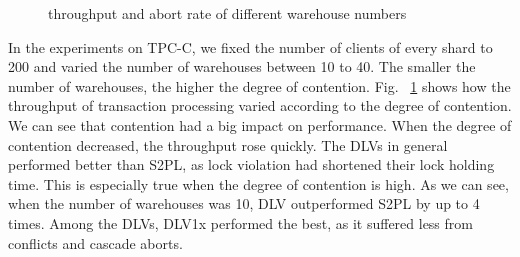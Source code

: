 \documentclass[conference]{IEEEtran}
\begin{document}
\begin{figure}[htbp]
  \centering

\caption{throughput and abort rate of
different warehouse numbers}
\label{fig:plot_tpcc_neworder_add_Warehouse_Warehouse_gather}
\end{figure}

In the experiments on TPC-C, we fixed the number of clients of every shard to 200 and varied the number of warehouses between 10 to 40.
The smaller the number of warehouses, the higher the degree of contention. 
Fig. ~\ref{fig:plot_tpcc_neworder_add_Warehouse_Warehouse_gather} shows how the throughput of transaction processing varied according to the degree of contention.
We can see that contention had a big impact on performance. When the degree of contention decreased, the throughput rose quickly.
The DLVs in general performed better than S2PL, as lock violation had shortened their lock holding time. 
This is especially true when the degree of contention is high. As we can see, when the number of warehouses was 10, DLV outperformed S2PL by up to 4 times.
Among the DLVs, DLV1x performed the best, as it suffered less from conflicts and cascade aborts.
\end{document}

